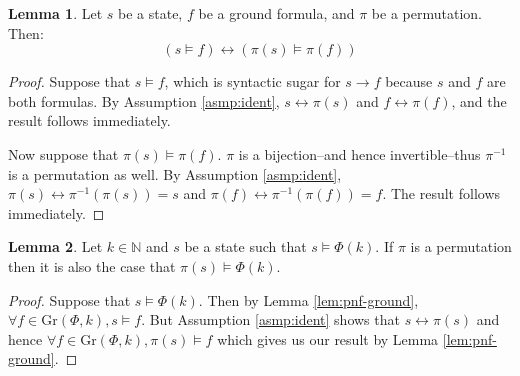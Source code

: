 \documentclass[12pt]{article}
\theoremstyle{definition}
\newtheorem{lemma}{Lemma}
\theoremstyle{remark}
\newcommand{\gr}{\text{Gr}}
\begin{document}
\begin{lemma}
  \label{lem:state-sat-perm}
  Let $s$ be a state, $f$ be a ground formula, and $\pi$ be a permutation.  Then:
  $$(s \models f) \leftrightarrow (\pi(s) \models \pi(f))$$
\end{lemma}
\begin{proof}
  Suppose that $s \models f$, which is syntactic sugar for $s \rightarrow f$ because $s$ and $f$ are both formulas.  By Assumption \ref{asmp:ident}, $s \leftrightarrow \pi(s)$ and $f \leftrightarrow \pi(f)$, and the result follows immediately.

  Now suppose that $\pi(s) \models \pi(f)$.  $\pi$ is a bijection--and hence invertible--thus $\pi^{-1}$ is a permutation as well.  By Assumption \ref{asmp:ident}, $\pi(s) \leftrightarrow \pi^{-1}(\pi(s)) = s$ and $\pi(f) \leftrightarrow \pi^{-1}(\pi(f)) = f$.  The result follows immediately.
\end{proof}

\begin{lemma}
  \label{lem:state-perm}
  Let $k \in \mathbb{N}$ and $s$ be a state such that $s \models \Phi(k)$.  If $\pi$ is a permutation then it is also the case that $\pi(s) \models \Phi(k)$.
\end{lemma}
\begin{proof}
  Suppose that $s \models \Phi(k)$.  Then by Lemma \ref{lem:pnf-ground}, $\forall f \in \gr(\Phi,k), s \models f$.  But Assumption \ref{asmp:ident} shows that $s \leftrightarrow \pi(s)$ and hence $\forall f \in \gr(\Phi,k), \pi(s) \models f$ which gives us our result by Lemma \ref{lem:pnf-ground}.
\end{proof}
\end{document}
